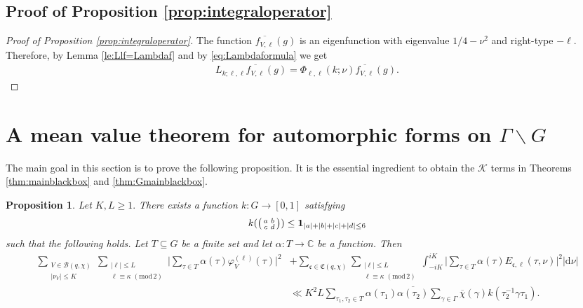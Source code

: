 \documentclass[12pt]{amsart}
\newtheorem{proposition}[theorem]{Proposition}
\theoremstyle{definition}
\theoremstyle{remark}
\numberwithin{equation}{section}
\newcommand{\B}{\mathcal{B}}
\newcommand{\C}{{\mathbb C}}
\newcommand{\1}{{\mathbf 1}}
\renewcommand{\d}{\mathrm d}
\renewcommand{\pmod}[1]{\,\,(\mathrm{mod}\,{#1})}
\begin{document}
\subsection{Proof of Proposition \ref{prop:integraloperator}}
\begin{proof}[Proof of Proposition \ref{prop:integraloperator}]



The function $\overline{f_{V,\ell}} (g)$ is an eigenfunction with eigenvalue $1/4-\nu^2$ and right-type $-\ell$. Therefore, by Lemma \ref{le:Llf=Lambdaf} and  by \eqref{eq:Lambdaformula} we get
\begin{align*}
    L_{k;\ell,\ell} \overline{f_{V,\ell}} (g) = \Phi_{\ell,\ell}(k;\nu) \overline{f_{V,\ell}} (g). 
\end{align*}

\end{proof}







\section{A mean value theorem for automorphic forms on $\Gamma \backslash G$} \label{sec:meanvalueauto}

The main goal in this section is to prove the following proposition. It is the essential ingredient to obtain the $\mathcal{K}$ terms in Theorems \ref{thm:mainblackbox} and \ref{thm:Gmainblackbox}.
\begin{proposition}\label{prop:boundbykernel}
Let $K,L \geq 1.$ There exists a function $k:G \to [0,1]$ satisfying
 \begin{align*}
     k(\smqty(a& b \\ c & d)) \leq \mathbf{1}_{|a|+|b|+|c|+|d| \leq 6}
 \end{align*}
 such that the following holds.  Let $T \subseteq G$ be a finite set and let $\alpha:T \to \C$ be a function. Then 
    \begin{align*}
     \sum_{\substack{V \in \B(q,\chi) \\  |\nu_V| \leq K }} \sum_{\substack{|\ell| \leq L  \\ \ell \equiv \kappa \pmod{2}}} \bigg| \sum_{\tau \in T }\alpha(\tau) \varphi_V^{(\ell)} (\tau)\bigg|^2& + \sum_{\mathfrak{c} \in \mathfrak{C}(q,\chi)} \sum_{\substack{|\ell| \leq L  \\ \ell \equiv \kappa \pmod{2}}} \int_{-iK}^{iK} \bigg| \sum_{\tau \in T }\alpha(\tau) E_{\mathfrak{c},\ell}(\tau,\nu)\bigg|^2 |\d \nu| \\
     & \ll K^2 L \sum_{\tau_1,\tau_2 \in T} \alpha(\tau_1) \overline{\alpha(\tau_2)} \sum_{\gamma \in \Gamma} \overline{\chi}(\gamma) k(\tau_2^{-1} \gamma \tau_1).
    \end{align*}
\end{proposition}
\end{document}
